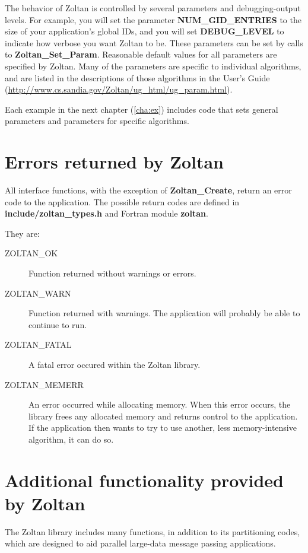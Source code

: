 The behavior of Zoltan is controlled by several parameters and debugging-output 
levels. 
For example, you will set the parameter \textbf{NUM\_GID\_ENTRIES} to the
size of your application's global IDs, and you will set \textbf{DEBUG\_LEVEL}
to indicate how verbose you want Zoltan to be.
These parameters can be set by calls to \textbf{Zoltan\_Set\_Param}. Reasonable 
default values for all parameters are specified by Zoltan. Many of the parameters 
are specific to individual algorithms, and are listed in the descriptions of those 
algorithms in the User's Guide 
(\url{http://www.cs.sandia.gov/Zoltan/ug\_html/ug\_param.html}).

Each example in the next chapter (\ref{cha:ex}) includes code that sets 
general parameters and parameters for specific algorithms.

\section{Errors returned by Zoltan}

All interface functions, with the exception of \textbf{Zoltan\_Create}, return an 
error code to the application. The possible return codes are defined in 
\textbf{include/zoltan\_types.h} and Fortran module \textbf{zoltan}.

They are:

\begin{description}
\item [ZOLTAN\_OK] Function returned without warnings or errors.
\item [ZOLTAN\_WARN] Function returned with warnings. The application will probably be able to continue to run.
\item [ZOLTAN\_FATAL] A fatal error occured within the Zoltan library.
\item [ZOLTAN\_MEMERR] An error occurred while allocating memory. When this error occurs, the library frees any allocated memory and returns control to the application. If the application then wants to try to use another, less memory-intensive algorithm, it can do so.
\end{description}

\section{Additional functionality provided by Zoltan}

The Zoltan library includes many functions, in addition to its
partitioning codes, which are designed to aid parallel
large-data message passing applications.

